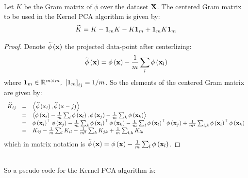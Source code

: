 \begin{lemma}\label{kernel_pca_centering}
Let $K$ be the Gram matrix of $\phi$ over the dataset $\mathbf{X}$. The centered Gram matrix to be used in the Kernel PCA algorithm is given by: $$ \widetilde{K} = K -\mathbf{1}_m K - K \mathbf{1}_m + \mathbf{1}_m K \mathbf{1}_m$$
\end{lemma}
\begin{proof}
Denote $\widetilde{\phi}\left(\mathbf{x}\right)$ the projected data-point after centerlizing: $$ \widetilde{\phi}\left(\mathbf{x}\right)=\phi\left(\mathbf{x}\right)-\frac{1}{m}\sum_l \phi\left(\mathbf{x}_l\right) $$ where $\mathbf{1}_m\in\mathbb{R}^{m\times m},\,\,\left[\mathbf{1}_m\right]_{ij} = 1/m$.
So the elements of the centered Gram matrix are given by:
$$
\begin{array}{ccl}
\widetilde{K}_{ij} & = & \left\langle \widetilde{\phi}\left(\mathbf{x}_i\right),\widetilde{\phi}\left(\mathbf{x}-j\right)\right\rangle \\
& = & \left\langle \phi\left(\mathbf{x}_i\right)-\frac{1}{m}\sum_l \phi\left(\mathbf{x}_l\right),\phi\left(\mathbf{x}_j\right)-\frac{1}{m}\sum_k \phi\left(\mathbf{x}_k\right)\right\rangle\\
& = & \phi\left(\mathbf{x}_i\right)^\top\phi\left(\mathbf{x}_j\right) -\frac{1}{m}\sum_k\phi\left(\mathbf{x}_i\right)^\top\phi\left(\mathbf{x}_k\right) -\frac{1}{m}\sum_l\phi\left(\mathbf{x}_l\right)^\top\phi\left(\mathbf{x}_j\right) + \frac{1}{m^2}\sum_{l,k}\phi\left(\mathbf{x}_l\right)^\top\phi\left(\mathbf{x}_k\right)\\
& = & K_{ij} - \frac{1}{m}\sum_l K_{il} - \frac{1}{m^2}\sum_k K_{jk} + \frac{1}{m}\sum_{l,k}K_{lk}
\end{array}
$$
which in matrix notation is $\widetilde{\phi}\left(\mathbf{x}\right)=\phi\left(\mathbf{x}\right)-\frac{1}{m}\sum_l \phi\left(\mathbf{x}_l\right)$.
\end{proof}

~\\So a pseudo-code for the Kernel PCA algorithm is:

